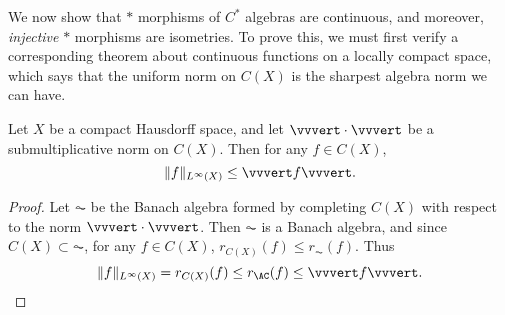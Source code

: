 \begin{comment}
\begin{theorem}
    If $\IA$ is a closed ideal of a $C^*$ algebra $\AC$, then $\AC/\IA$ is a $C^*$ algebra.
\end{theorem}
\begin{proof}
    Letting $\{ E_\alpha \}$ be the positive approximate identity for $\IA$, we find
    \begin{align*}
        \| M + \IA \|^2 &= \lim_\alpha \| M (1 - E_\alpha) \|^2\\
        &= \lim_\alpha \| (1 - E_\alpha) M^*M (1 - E_\alpha) \|\\
        &\leq \lim_\alpha \| (1 - E_\alpha) M^*M \|\\
        &= \| M^*M + \IA \|\\
        &\leq \| M^* + \IA \| \| M + \IA \|
    \end{align*}
    And it is easy to see that $\| M^* + \IA \| = \| M + \IA \|$, for $\IA$ is closed under involution, so we find
    \[ \| M + \IA \|^2 = \| M^*M + \IA \| \]
    and this is exactly the $C^*$ identity for the quotient algebra.
\end{proof}
\end{comment}

We now show that $*$ morphisms of $C^*$ algebras are continuous, and moreover, \emph{injective} $*$ morphisms are isometries. To prove this, we must first verify a corresponding theorem about continuous functions on a locally compact space, which says that the uniform norm on $C(X)$ is the sharpest algebra norm we can have.

\begin{lemma}
    Let $X$ be a compact Hausdorff space, and let $\vvvert \cdot \vvvert$ be a submultiplicative norm on $C(X)$. Then for any $f \in C(X)$,
    \[ \| f \|_{L^\infty(X)} \leq \vvvert f \vvvert. \]
\end{lemma}
\begin{proof}
    Let $\AC$ be the Banach algebra formed by completing $C(X)$ with respect to the norm $\vvvert \cdot \vvvert$. Then $\AC$ is a Banach algebra, and since $C(X) \subset \AC$, for any $f \in C(X)$, $r_{C(X)}(f) \leq r_{\AC}(f)$. Thus
    \[ \| f \|_{L^\infty(X)} = r_{C(X)}(f) \leq r_{\AC}(f) \leq \vvvert f \vvvert. \qedhere \]
\end{proof}

